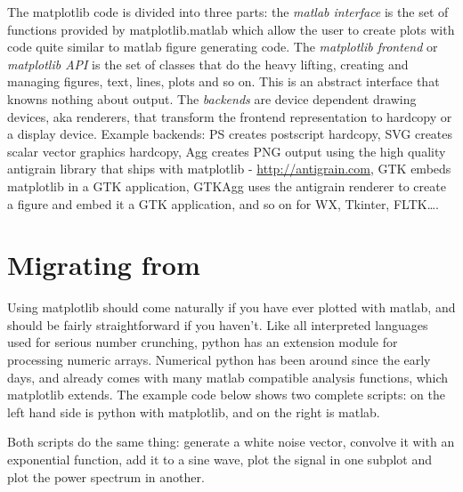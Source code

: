 \documentclass[twoside,10pt]{book}
\begin{document}
The matplotlib code is divided into three parts: the \textit{matlab
  interface} is the set of functions provided by matplotlib.matlab
which allow the user to create plots with code quite similar to matlab
figure generating code.  The \textit{matplotlib frontend} or
\textit{matplotlib API} is the set of classes that do the heavy
lifting, creating and managing figures, text, lines, plots and so on.
This is an abstract interface that knowns nothing about output.  The
\textit{backends} are device dependent drawing devices, aka renderers,
that transform the frontend representation to hardcopy or a display
device.  Example backends: PS creates postscript hardcopy, SVG creates
scalar vector graphics hardcopy, Agg creates PNG output using the high
quality antigrain library that ships with matplotlib -
\url{http://antigrain.com}, GTK embeds matplotlib in a GTK
application, GTKAgg uses the antigrain renderer to create a figure and
embed it a GTK application, and so on for WX, Tkinter, FLTK\dots.



\section*{\myheadersize Migrating from \matlab}

Using matplotlib should come naturally if you have ever plotted with
matlab, and should be fairly straightforward if you haven't.  Like all
interpreted languages used for serious number crunching, python has an
extension module for processing numeric arrays.  Numerical python has
been around since the early days, and already comes with many matlab
compatible analysis functions, which matplotlib extends.  The example
code below shows two complete scripts: on the left hand side is python
with matplotlib, and on the right is matlab.  

Both scripts do the same thing: generate a white noise vector,
convolve it with an exponential function, add it to a sine wave, plot
the signal in one subplot and plot the power spectrum in another.
\end{document}
